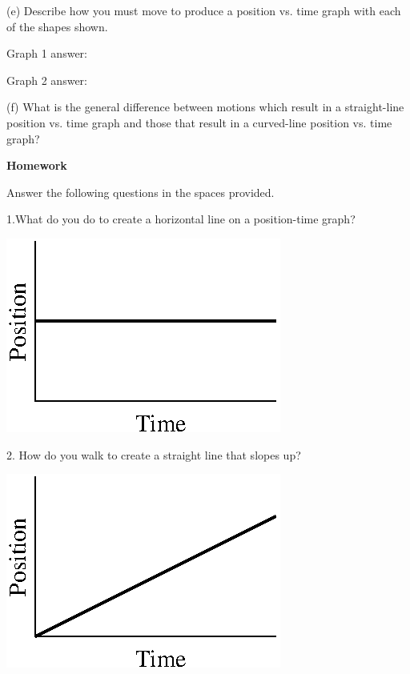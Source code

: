 (e) Describe how you must move to produce a position vs. time graph with each
of the shapes shown.

Graph 1 answer:
\vspace{10mm}

Graph 2 answer:
\vspace{10mm}

(f) What is the general difference between motions which result in a straight-line
position vs. time graph and those that result in a curved-line position vs.
time graph?
\vspace{20mm}

\textbf{Homework} 

Answer the following questions in the spaces provided.

1.What do you do to create a horizontal line on a position-time graph?

\vspace{0.3cm}
{\par\raggedright \includegraphics{position/position_fig5.eps} \par}
\vspace{0.3cm}

2. How do you walk to create a straight line that slopes up?

\vspace{0.3cm}
{\par\raggedright \includegraphics{position/position_fig6.eps} \par}
\vspace{0.3cm}

